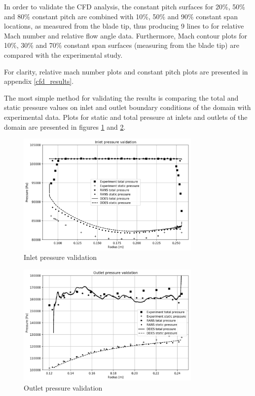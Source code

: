In order to validate the CFD analysis, the constant pitch surfaces for 20\%, 50\% and 80\% constant pitch are combined with 10\%, 50\% and 90\% constant span locations, as measured from the blade tip, thus producing 9 lines to for relative Mach number and relative flow angle data. Furthermore, Mach contour plots for 10\%, 30\% and 70\% constant span surfaces (measuring from the blade tip) are compared with the experimental study.

For clarity, relative mach number plots and constant pitch plots are presented in appendix \ref{cfd_results}. 

The most simple method for validating the results is comparing the total and static pressure values on inlet and outlet boundary conditions of the domain with experimental data. Plots for static and total pressure at inlets and outlets of the domain are presented in figures \ref{pvalid_in} and \ref{pvalid_out}. 

\begin{figure}[h!]
\centering %
\includegraphics[width=0.8\textwidth]{Pictures/pvalid_in.png}
\caption{Inlet pressure validation}
\label{pvalid_in}
\end{figure}

\begin{figure}[h!]
\centering %
\includegraphics[width=0.8\textwidth]{Pictures/pvalid_out.png}
\caption{Outlet pressure validation}
\label{pvalid_out}
\end{figure}

